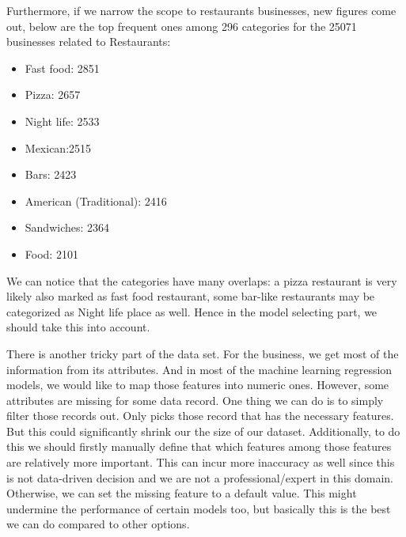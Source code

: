 \documentclass{article}
\begin{document}
Furthermore, if we narrow the scope to restaurants businesses, new figures come out, below are the top frequent ones among 296 categories for the 25071 businesses related to Restaurants:
\begin{itemize}
\item Fast food: 2851
\item Pizza: 2657
\item Night life: 2533
\item Mexican:2515
\item Bars: 2423
\item American (Traditional): 2416
\item Sandwiches: 2364
\item Food: 2101
\end{itemize}

We can notice that the categories have many overlaps: a pizza restaurant is very likely also marked as fast food restaurant, some bar-like restaurants may be categorized as Night life place as well. Hence in the model selecting part, we should take this into account.

There is another tricky part of the data set. For the business, we get most of the information from its attributes. And in most of the machine learning regression models, we would like to map those features into numeric ones. However, some attributes are missing for some data record. 
One thing we can do is to simply filter those records out. Only picks those record that has the necessary features. But this could significantly shrink our the size of our dataset. Additionally, to do this we should firstly manually define that which features among those features are relatively more important. This can incur more  inaccuracy as well since this is not data-driven decision and we are not a professional/expert in this domain.
Otherwise, we can set the missing feature to a default value. This might undermine the performance of certain models too, but basically this is the best we can do compared to other options.
\end{document}
